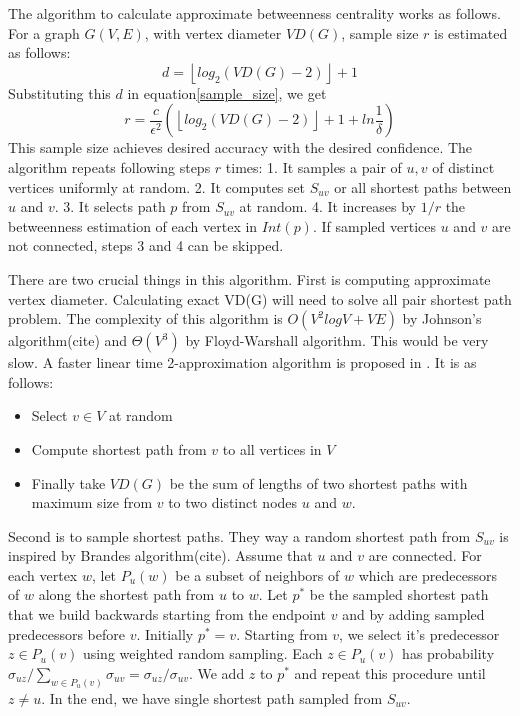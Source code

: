 \documentclass[runningheads,a4paper]{llncs}
\begin{document}
The algorithm to calculate approximate betweenness centrality works as follows. For a graph $G(V,E)$, with vertex diameter $VD(G)$, sample size $r$ is estimated as follows:
$$ d = \left\lfloor{log_{2}(VD(G) - 2)}\right\rfloor + 1$$
Substituting this $d$ in equation\ref{sample_size}, we get
\begin{equation} \label{sample_size_algo}
r = \frac{c}{\epsilon^{2}}(\left\lfloor{log_{2}(VD(G) - 2)}\right\rfloor + 1 + ln\frac{1}{\delta})
\end{equation}
This sample size achieves desired accuracy with the desired confidence. The algorithm repeats following steps $r$ times: 1. It samples a pair of $u,v$ of distinct vertices uniformly at random. 2. It computes set $S_{uv}$ or all shortest paths between $u$ and $v$. 3. It selects path $p$ from $S_{uv}$ at random. 4. It increases by $1/r$ the betweenness estimation of each vertex in $Int(p)$. If sampled vertices $u$ and $v$ are not connected, steps 3 and 4 can be skipped. 

There are two crucial things in this algorithm. First is computing approximate vertex diameter. Calculating exact VD(G) will need to solve all pair shortest  path problem. The complexity of this algorithm is $O(V^{2}logV + VE)$ by Johnson's algorithm(cite) and $\Theta(V^{3})$ by Floyd-Warshall algorithm. This would be very slow. A faster linear time 2-approximation algorithm is proposed in \cite{matteo}. It is as follows:
\begin{itemize}
\item Select $v \in V$ at random
\item Compute shortest path from $v$ to all vertices in $V$
\item Finally take $VD(G)$ be the sum of lengths of two shortest paths with maximum size from $v$ to two distinct nodes $u$ and $w$. 
\end{itemize}

Second is to sample shortest paths. They way a random shortest path from $S_{uv}$ is inspired by Brandes algorithm(cite). Assume that $u$ and $v$ are connected. For each vertex $w$, let $P_{u}(w)$ be a subset of neighbors of $w$ which are predecessors of $w$ along the shortest path from $u$ to $w$. Let $p^{*}$ be the sampled shortest path that we build backwards starting from the endpoint $v$ and by adding sampled predecessors before $v$. Initially $p^{*} = {v}$. Starting from $v$, we select it's predecessor $z \in P_{u}(v)$ using weighted random sampling. Each $z \in P_{u}(v)$ has probability $\sigma_{uz}/\sum_{w \in P_{u}(v)}\sigma_{uv} = \sigma_{uz}/\sigma_{uv}$. We add $z$ to $p^{*}$ and repeat this procedure until $z \neq u$. In the end, we have single shortest path sampled from $S_{uv}$. 
 
\end{document}
